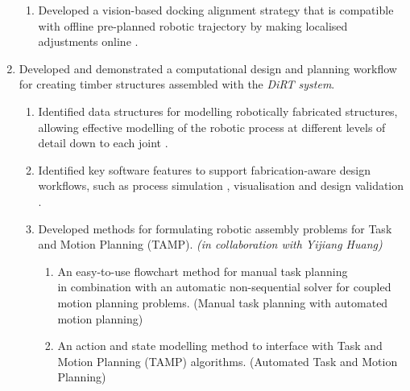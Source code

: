\begin{enumerate}
\begin{enumerate}
		\item Developed a vision-based docking alignment strategy that is compatible with offline pre-planned robotic trajectory by making localised adjustments online .

	\end{enumerate}

	\item Developed and demonstrated a computational design and planning workflow for creating timber structures assembled with the \textit{DiRT system}.
	\begin{enumerate}
		\item Identified data structures for modelling robotically fabricated structures, allowing effective modelling of the robotic process at different levels of detail down to each joint .

		\item Identified key software features to support fabrication-aware design workflows, such as process simulation , visualisation  and design validation .

		\item Developed methods for formulating robotic assembly problems for Task and Motion Planning (TAMP). \textit{(in collaboration with Yijiang Huang)} 

		\begin{enumerate}
			\item An easy-to-use flowchart method for manual task planning\\  in combination with an automatic non-sequential solver  for coupled motion planning problems. (Manual task planning with automated motion planning)

			\item An action and state modelling method to interface with Task and Motion Planning (TAMP) algorithms. (Automated Task and Motion Planning) 

		\end{enumerate}
	\end{enumerate}


\end{enumerate}
